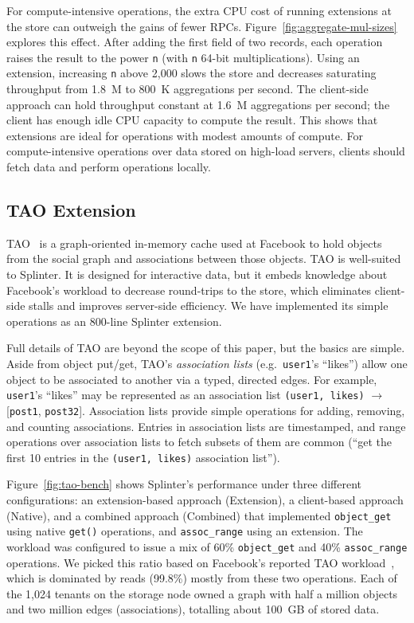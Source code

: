 For compute-intensive operations, the extra CPU cost of
running extensions at the store can outweigh the gains of fewer RPCs.
Figure~\ref{fig:aggregate-mul-sizes} explores this effect.
After adding the first field of two records, each operation raises the
  result to the power \texttt{n} (with \texttt{n} 64-bit
  multiplications).
Using an extension, increasing \texttt{n} above 2,000
  slows the store and decreases
  saturating throughput from 1.8~M to 800~K aggregations per second.
The client-side approach can hold throughput constant
  at 1.6~M aggregations per second;
the client has enough idle CPU capacity to compute the result.
This shows that extensions are ideal for operations with
  modest amounts of compute.
For compute-intensive operations over data stored on high-load servers,
  clients should fetch data and perform operations locally.

\subsection{TAO Extension}

TAO~\cite{tao-2013} is a graph-oriented in-memory cache used at Facebook to hold
  objects from the social graph and associations between those objects.
TAO is well-suited to Splinter.
It is designed for interactive data, but it embeds knowledge
  about Facebook's workload to decrease round-trips to the store, which
  eliminates client-side stalls and improves server-side efficiency.
We have implemented its simple operations as an 800-line Splinter extension.

Full details of TAO are beyond the scope of this paper, but the basics are
  simple. Aside from object put/get, TAO's \textsl{association lists} (e.g.\
  \texttt{user1}'s ``likes'') allow one object to be
  associated to another via a typed, directed edges.
For example, \texttt{user1}'s ``likes'' may be represented as an association list
  \texttt{(user1, likes)} $\rightarrow$ [\texttt{post1}, \texttt{post32}].
Association lists provide simple operations for adding, removing, and counting
  associations. Entries in association lists are timestamped, and range operations
  over association lists to fetch subsets of them are common (``get the first 10 entries in
  the \texttt{(user1, likes)} association list'').

Figure~\ref{fig:tao-bench} shows Splinter's performance under three
different configurations: an extension-based approach (Extension), a
client-based approach (Native), and a combined approach (Combined) that implemented
\texttt{object\_get} using native \texttt{get()} operations, and
\texttt{assoc\_range} using an extension.
The workload was configured to
issue a mix of 60\%
  \texttt{object\_get} and 40\% \texttt{assoc\_range} operations.
We picked this ratio based on Facebook's reported TAO workload~\cite{tao-2013},
  which is dominated by reads (99.8\%) mostly from these two operations.
Each of the 1,024 tenants on the storage node owned a graph with half a million
  objects and two million edges (associations), totalling about 100~GB of
  stored data.

